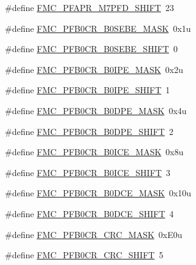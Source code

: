 \begin{DoxyCompactItemize}
\item 
\#define \hyperlink{group___f_m_c___register___masks_ga4589e8d60db033a3ab174e976a5d3dcf}{F\+M\+C\+\_\+\+P\+F\+A\+P\+R\+\_\+\+M7\+P\+F\+D\+\_\+\+S\+H\+I\+FT}~23
\item 
\#define \hyperlink{group___f_m_c___register___masks_ga9eede1bc45bf3cbaf00b4e9960f5e7eb}{F\+M\+C\+\_\+\+P\+F\+B0\+C\+R\+\_\+\+B0\+S\+E\+B\+E\+\_\+\+M\+A\+SK}~0x1u
\item 
\#define \hyperlink{group___f_m_c___register___masks_gac7bd1c5a4c5f35eb2d02351977e6a274}{F\+M\+C\+\_\+\+P\+F\+B0\+C\+R\+\_\+\+B0\+S\+E\+B\+E\+\_\+\+S\+H\+I\+FT}~0
\item 
\#define \hyperlink{group___f_m_c___register___masks_gab46173be15cdda210e83a041f8eeb809}{F\+M\+C\+\_\+\+P\+F\+B0\+C\+R\+\_\+\+B0\+I\+P\+E\+\_\+\+M\+A\+SK}~0x2u
\item 
\#define \hyperlink{group___f_m_c___register___masks_ga9fccb996200782cf4a1ec8d2418da2e5}{F\+M\+C\+\_\+\+P\+F\+B0\+C\+R\+\_\+\+B0\+I\+P\+E\+\_\+\+S\+H\+I\+FT}~1
\item 
\#define \hyperlink{group___f_m_c___register___masks_gaff35af9c8bc3c5cf2f6bf9dd76253a02}{F\+M\+C\+\_\+\+P\+F\+B0\+C\+R\+\_\+\+B0\+D\+P\+E\+\_\+\+M\+A\+SK}~0x4u
\item 
\#define \hyperlink{group___f_m_c___register___masks_gabe5b35383e6d2198f45bc66429b0ce61}{F\+M\+C\+\_\+\+P\+F\+B0\+C\+R\+\_\+\+B0\+D\+P\+E\+\_\+\+S\+H\+I\+FT}~2
\item 
\#define \hyperlink{group___f_m_c___register___masks_ga093ec774220ef7557784c2cea999502e}{F\+M\+C\+\_\+\+P\+F\+B0\+C\+R\+\_\+\+B0\+I\+C\+E\+\_\+\+M\+A\+SK}~0x8u
\item 
\#define \hyperlink{group___f_m_c___register___masks_ga7595313d5ea6aa0ddb4fa755bad06110}{F\+M\+C\+\_\+\+P\+F\+B0\+C\+R\+\_\+\+B0\+I\+C\+E\+\_\+\+S\+H\+I\+FT}~3
\item 
\#define \hyperlink{group___f_m_c___register___masks_ga2ef77cab94225466d9301d03fc02b432}{F\+M\+C\+\_\+\+P\+F\+B0\+C\+R\+\_\+\+B0\+D\+C\+E\+\_\+\+M\+A\+SK}~0x10u
\item 
\#define \hyperlink{group___f_m_c___register___masks_gaf25cde827cdccda0268d84a381fb8ab2}{F\+M\+C\+\_\+\+P\+F\+B0\+C\+R\+\_\+\+B0\+D\+C\+E\+\_\+\+S\+H\+I\+FT}~4
\item 
\#define \hyperlink{group___f_m_c___register___masks_ga2ba15c609c4ff7e43ed4d6119b704ddd}{F\+M\+C\+\_\+\+P\+F\+B0\+C\+R\+\_\+\+C\+R\+C\+\_\+\+M\+A\+SK}~0x\+E0u
\item 
\#define \hyperlink{group___f_m_c___register___masks_ga45e4e9c3fff1241f2d1fffa05825efc8}{F\+M\+C\+\_\+\+P\+F\+B0\+C\+R\+\_\+\+C\+R\+C\+\_\+\+S\+H\+I\+FT}~5

\end{DoxyCompactItemize}
